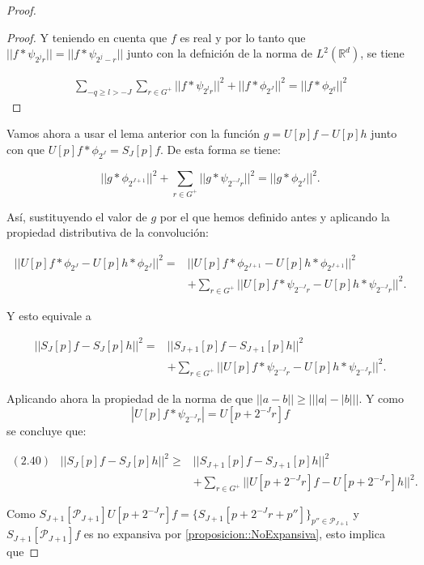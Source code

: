 \begin{proof}
\begin{proof}
  \noindent Y teniendo en cuenta que $f$ es real y por lo tanto que $||f \ast \psi_{2^j r}||= ||f \ast \psi_{2^j -r}||$ junto con la defnición de la norma de $L^2(\mathbb{R}^d)$, se tiene  

  \begin{align*}
    \sum_{-q\geq l > -J} \sum_{r \in G^+} || f \ast \psi_{2^lr}||^2 + || f \ast \phi_{2^J}||^2 = || f \ast \phi_{2^q} ||^2
  \end{align*}

\end{proof}


Vamos ahora a usar el lema anterior con la función $g=U[p]f-U[p]h$ junto con que $U[p]f\ast \phi_{2^J}=S_J[p]f$. De esta forma se tiene:

$$||g \ast \phi_{2^{J+1}} ||^2 + \sum_{r\in G^+} || g\ast \psi_{2^{-J}r} ||^2=||g \ast \phi_{2^J}||^2.$$

\noindent Así, sustituyendo el valor de $g$ por el que hemos definido antes y aplicando la propiedad distributiva de la convolución:

\begin{align*}
  ||U[p]f \ast \phi_{2^J} -U[p]h \ast \phi_{2^J}||^2 = &||U[p]f \ast \phi_{2^{J+1}} - U[p]h \ast \phi_{2^{J+1}} ||^2 \\
  & + \sum_{r\in G^+} || U[p]f\ast \psi_{2^{-J}r} -U[p]h \ast \psi_{2^{-J}r}||^2.
\end{align*}

\noindent Y esto equivale a

\begin{align*}
  ||S_{J}[p]f-S_J[p]h||^2 = &|| S_{J+1}[p]f-S_{J+1}[p]h||^2 \\
  & + \sum_{r\in G^+} || U[p]f\ast \psi_{2^{-J}r} -U[p]h \ast \psi_{2^{-J}r}||^2.
\end{align*}

\noindent Aplicando ahora la propiedad de la norma de que $\left|\left|a - b \right|\right| \geq \left|\left| |a| - |b| \right|\right|$. Y como $$|U[p]f\ast\psi_{2^{-J}r}|=U[p+2^{-J}r]f$$ se concluye que:

\begin{align*}
    (2.40) \;\;\; ||S_{J}[p]f-S_J[p]h||^2 \geq & || S_{J+1}[p]f-S_{J+1}[p]h||^2 \\
    & + \sum_{r\in G^+} ||U[p+2^{-J}r]f-U[p+2^{-J}r]h||^2.
\end{align*}


\noindent Como $S_{J+1}[\mathcal{P}_{J+1}]U[p+2^{-J}r]f=\lbrace S_{J+1} [p+2^{-J}r+p'']\rbrace_{p''\in\mathcal{P}_{J+1}}$  y $S_{J+1}[\mathcal{P}_{J+1}]f$ es no expansiva por \autoref{proposicion::NoExpansiva}, esto implica que


\end{proof}
